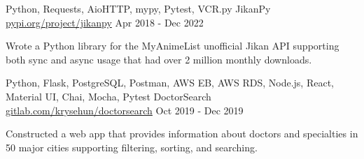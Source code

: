 

\begin{cventries}

    \cventry
    {Python, Requests, AioHTTP, mypy, Pytest, VCR.py} %
    {JikanPy} %
    {\href{https://pypi.org/project/jikanpy/}{pypi.org/project/jikanpy}} %
    {Apr 2018 - Dec 2022} %
    {
        \begin{cvitems} %
            \item {Wrote a Python library for the MyAnimeList unofficial Jikan API supporting both sync and async usage that had over 2 million monthly downloads.}
        \end{cvitems}
    }

    \cventry
    {Python, Flask, PostgreSQL, Postman, AWS EB, AWS RDS, Node.js, React, Material UI, Chai, Mocha, Pytest} %
    {DoctorSearch} %
    {\href{https://gitlab.com/krysehun/doctorsearch}{gitlab.com/krysehun/doctorsearch}} %
    {Oct 2019 - Dec 2019} %
    {
        \begin{cvitems} %
            \item {Constructed a web app that provides information about doctors and specialties in 50 major cities supporting filtering, sorting, and searching.}
        \end{cvitems}
    }

\end{cventries}
